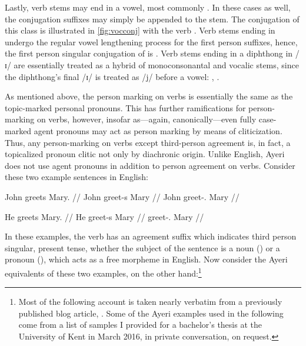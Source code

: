 Lastly, verb stems may end in a vowel, most commonly . In these cases as 
well, the conjugation suffixes may simply be appended to the stem. The 
conjugation of this class is illustrated in \autoref{fig:vocconj} with the verb 
. Verb stems ending in  undergo the regular vowel 
lengthening process for the first person suffixes, hence, the first person 
singular conjugation of  is . 
Verb stems ending in a diphthong in /ɪ/ are essentially treated as a hybrid of 
monoconsonantal and vocalic stems, since the diphthong's final /ɪ/ is treated 
as /j/ before a vowel: , 
.

As mentioned above, the person marking on verbs is essentially the same as the 
topic-marked personal pronouns. This has further ramifications for 
person-marking on verbs, however, insofar as---again, canonically---even fully 
case-marked agent pronouns may act as person marking by means of cliticization. 
Thus, any person-marking on verbs except third-person agreement is, in fact, a 
topicalized pronoun clitic not only by diachronic origin. Unlike English, Ayeri 
does not use agent pronouns in addition to person agreement on verbs. Consider 
these two example sentences in English:

\pex
\a\label{ex:vbagrengnn}\begingl{}%
	\gla John greets Mary. //
	\glb John greet-s Mary //
	\glc John greet-\Tsg{}.\Prs{} Mary //
\endgl

\a\label{ex:vbagrengpr}\begingl
	\gla He greets Mary. //
	\glb He greet-s Mary //
	\glc \TsgM{} greet-\Tsg{}.\Prs{} Mary //
\endgl

\xe

In these examples, the verb has an agreement suffix  which indicates 
third person singular, present tense, whether the subject of the sentence is a 
noun () or a pronoun (), which acts as a free morpheme in 
English. Now consider the Ayeri equivalents of these two examples, on the other 
hand:\footnote{Most of the following account is taken nearly verbatim from a 
previously published blog article, \citet{benung:verbagreement}. Some of the 
Ayeri examples used in the following come from a list of samples I provided for 
a bachelor's thesis at the University of Kent in March 2016, in private 
conversation, on request.%
}

